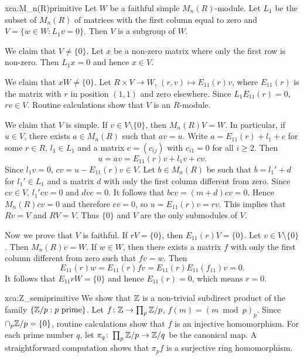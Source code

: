 \begin{sol}{xca:M_n(R)primitive}
    Let $W$ be a faithful simple $M_n(R)$-module. Let 
    $L_1$ be the subset of $M_n(R)$ of matrices 
    with the first column equal to zero and 
    $V=\{w\in W:L_1v=0\}$. Then $V$ is a subgroup of $W$. 

    We claim that $V\ne\{0\}$. Let $x$ be 
    a non-zero matrix where only the first row is non-zero. Then 
    $L_1x=0$ and hence $x\in V$. 

    We claim that $xW\ne\{0\}$. 
    Let $R\times V\to W$, $(r,v)\mapsto E_{11}(r)v$, where $E_{11}(r)$ is the matrix 
    with $r$ in position $(1,1)$ and zero elsewhere. Since 
    $L_1E_{11}(r)=0$, $rv\in V$. Routine calculations show
    that $V$ is an $R$-module. 
    
    We claim that $V$ is simple. 
    If $v\in V\setminus\{0\}$, then 
    $M_n(R)V=W$. In particular, if $u\in V$, 
    there exists $a\in M_n(R)$ 
    such that $av=u$. Write $a=E_{11}(r)+l_1+c$ for
    some $r\in R$, $l_1\in L_1$ and a matrix 
    $c=(c_{ij})$ with $c_{i1}=0$ for all $i\geq2$. Then
    \[
    u=av=E_{11}(r)v+l_1v+cv.
    \]
    Since $l_1v=0$, $cv=u-E_{11}(r)v\in V$. Let $b\in M_n(R)$ 
    be such that $b=l_1'+d$ for $l_1'\in L_1$ and a matrix $d$
    with only the first column different from zero. Since $cv\in V$, 
    $l_1'cv=0$ and $dvc=0$. It follows that
    $bcv=(m+d)cv=0$. Hence $M_n(R)cv=0$ and 
    therefore $cv=0$, so $u=E_{11}(r)v=rv$. This implies that 
    $Rv=V$ and $RV=V$. Thus $\{0\}$ and $V$ are the only 
    submodules of $V$. 

    Now we prove that $V$ is faithful. If $rV=\{0\}$, then
    $E_{11}(r)V=\{0\}$. Let $v\in V\setminus\{0\}$. Then
    $M_n(R)v=W$. If $w\in W$, then there exists 
    a matrix $f$ with only the first column different from zero
    such that $fv=w$. Then
    \[
    E_{11}(r)w=E_{11}(r)fv=E_{11}(r)E_{11}(f_{11})v=0.
    \]
    It follows that $E_{11}rW=\{0\}$ and
    hence $E_{11}(r)=0$, which means $r=0$.
\end{sol}
%

\begin{sol}{xca:Z_semiprimitive}
    We show that $\mathbb{Z}$ is a non-trivial subdirect product of the family $\{\mathbb{Z}/p:p\text{ prime}\}$. 
    Let $f\colon\mathbb{Z}\to \prod_{p}\mathbb{Z}/p$, $f(m)=(m\bmod p)_{p}$. Since $\cap_p\mathbb{Z}/p=\{0\}$, routine calculations show that 
    $f$ is an injective homomorphism. For each prime number $q$, let $\pi_q\colon\prod_{p}\mathbb{Z}/p\to\mathbb{Z}/q$ be the canonical map. A straightforward computation 
    shows that 
    $\pi_pf$ is a surjective ring homomorphism. 
\end{sol}

